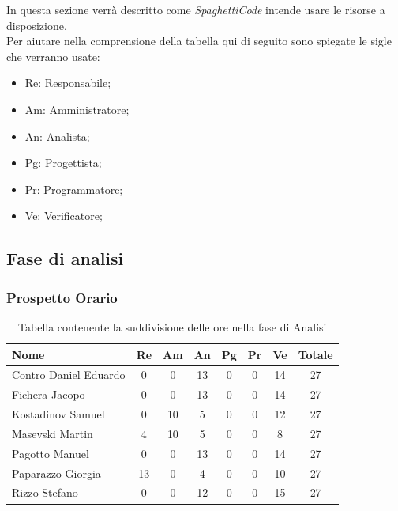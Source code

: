 \documentclass[../piano_di_progetto.tex]{subfiles}
\begin{document}
In questa sezione verrà descritto come \emph{SpaghettiCode} intende usare le risorse a disposizione. \\
Per aiutare nella comprensione della tabella qui di seguito sono spiegate le sigle che verranno usate:
\begin{itemize}
\item Re: Responsabile;
\item Am: Amministratore;
\item An: Analista;
\item Pg: Progettista;
\item Pr: Programmatore;
\item Ve: Verificatore;
\end{itemize}


\subsection{ Fase di analisi}%
\label{sub:fase_analisi}
\subsubsection{Prospetto Orario}


\begin{table}[!ht]

	\centering
	\begin{tabular}{|l|c|c|c|c|c|c|c|}
	\hline
	\rowcolor{lightgray}
	\textbf{Nome} & \textbf{Re} & \textbf{Am} & \textbf{An} & \textbf{Pg}  & \textbf{Pr}   & \textbf{Ve} & \textbf{Totale} \\

	\hline
		Contro Daniel Eduardo & 0 & 0 & 13 & 0 & 0 & 14 & 27 \\
	\hline
		Fichera Jacopo & 0 & 0 & 13 & 0 & 0 & 14 & 27 \\
	\hline
		Kostadinov Samuel & 0 & 10 & 5 & 0 & 0 & 12 & 27 \\			
	\hline
		Masevski Martin & 4 & 10 & 5 & 0 & 0 & 8 & 27 \\
	\hline
		Pagotto Manuel & 0 & 0 & 13 & 0 & 0 & 14 & 27 \\			
	\hline
		Paparazzo Giorgia & 13 & 0 & 4 & 0 & 0 & 10 & 27 \\
	\hline
		Rizzo Stefano & 0 & 0 & 12 & 0 & 0 & 15 & 27 \\
	\hline	
	\end{tabular}
	\caption{Tabella contenente la suddivisione delle ore nella fase di Analisi}
\end{table}
\end{document}
